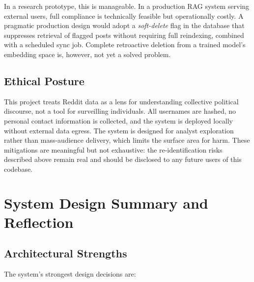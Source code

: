 \documentclass[11pt,a4paper]{article}
\begin{document}
In a research prototype, this is manageable. In a production RAG system serving external users, full compliance is technically feasible but operationally costly. A pragmatic production design would adopt a \textit{soft-delete} flag in the database that suppresses retrieval of flagged posts without requiring full reindexing, combined with a scheduled sync job. Complete retroactive deletion from a trained model's embedding space is, however, not yet a solved problem.

\subsection{Ethical Posture}

This project treats Reddit data as a lens for understanding collective political discourse, not a tool for surveilling individuals. All usernames are hashed, no personal contact information is collected, and the system is deployed locally without external data egress. The system is designed for analyst exploration rather than mass-audience delivery, which limits the surface area for harm. These mitigations are meaningful but not exhaustive: the re-identification risks described above remain real and should be disclosed to any future users of this codebase.

\section{System Design Summary and Reflection}

\subsection{Architectural Strengths}

The system's strongest design decisions are:
\end{document}
